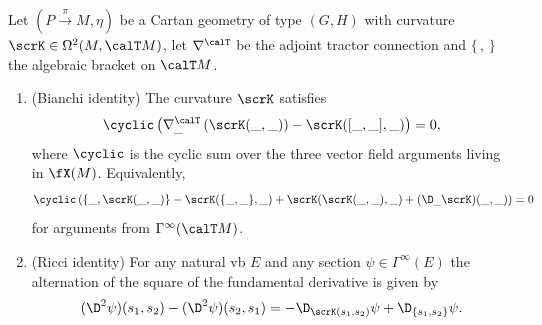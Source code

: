 \begin{prop}\label{prop 1.5.9 Cap}
    Let $(P\overset{\pi}{\to}M,\eta)$ be a Cartan geometry of type $(G,H)$ with curvature $\scrK\in\Omega^2(M,\calT M)$, let $\nabla^\calT$ be the adjoint tractor connection and $\{\,,\,\}$ the algebraic bracket on $\calT M$.
    \begin{enumerate}[label=(\arabic*)]
        \item (Bianchi identity) The curvature $\scrK$ satisfies 
        \[\cyclic \left(\nabla^\calT_{\_}\left(\scrK(\_,\_)\right)-\scrK([\_,\_],\_)\right)=0,\label{eq 1.24 Cap}\]
        where $\cyclic$ is the cyclic sum over the three vector field arguments living in $\fX(M)$. Equivalently, 
        \[\cyclic\left(\{\_,\scrK(\_,\_)\}-\scrK(\{\_,\_\},\_)+\scrK(\scrK(\_,\_),\_)+(\D_{\_}\scrK)(\_,\_)\right)=0\label{eq 1.25 Cap}\]
        for arguments from $\Gamma^\infty(\calT M)$.
        \item (Ricci identity) For any natural \gls{vb} $E$ and any section $\psi\in\Gamma^\infty(E)$ the alternation of the square of the fundamental derivative is given by 
        \[(\D^2\psi)(s_1,s_2)-(\D^2\psi)(s_2,s_1)=-\D_{\scrK(s_1,s_2)}\psi+\D_{\{s_1,s_2\}}\psi.\]
    \end{enumerate}
\end{prop}
